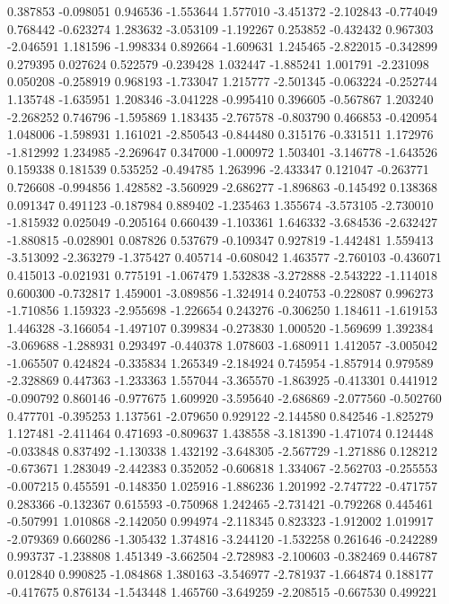 0.387853
-0.098051
0.946536
-1.553644
1.577010
-3.451372
-2.102843
-0.774049
0.768442
-0.623274
1.283632
-3.053109
-1.192267
0.253852
-0.432432
0.967303
-2.046591
1.181596
-1.998334
0.892664
-1.609631
1.245465
-2.822015
-0.342899
0.279395
0.027624
0.522579
-0.239428
1.032447
-1.885241
1.001791
-2.231098
0.050208
-0.258919
0.968193
-1.733047
1.215777
-2.501345
-0.063224
-0.252744
1.135748
-1.635951
1.208346
-3.041228
-0.995410
0.396605
-0.567867
1.203240
-2.268252
0.746796
-1.595869
1.183435
-2.767578
-0.803790
0.466853
-0.420954
1.048006
-1.598931
1.161021
-2.850543
-0.844480
0.315176
-0.331511
1.172976
-1.812992
1.234985
-2.269647
0.347000
-1.000972
1.503401
-3.146778
-1.643526
0.159338
0.181539
0.535252
-0.494785
1.263996
-2.433347
0.121047
-0.263771
0.726608
-0.994856
1.428582
-3.560929
-2.686277
-1.896863
-0.145492
0.138368
0.091347
0.491123
-0.187984
0.889402
-1.235463
1.355674
-3.573105
-2.730010
-1.815932
0.025049
-0.205164
0.660439
-1.103361
1.646332
-3.684536
-2.632427
-1.880815
-0.028901
0.087826
0.537679
-0.109347
0.927819
-1.442481
1.559413
-3.513092
-2.363279
-1.375427
0.405714
-0.608042
1.463577
-2.760103
-0.436071
0.415013
-0.021931
0.775191
-1.067479
1.532838
-3.272888
-2.543222
-1.114018
0.600300
-0.732817
1.459001
-3.089856
-1.324914
0.240753
-0.228087
0.996273
-1.710856
1.159323
-2.955698
-1.226654
0.243276
-0.306250
1.184611
-1.619153
1.446328
-3.166054
-1.497107
0.399834
-0.273830
1.000520
-1.569699
1.392384
-3.069688
-1.288931
0.293497
-0.440378
1.078603
-1.680911
1.412057
-3.005042
-1.065507
0.424824
-0.335834
1.265349
-2.184924
0.745954
-1.857914
0.979589
-2.328869
0.447363
-1.233363
1.557044
-3.365570
-1.863925
-0.413301
0.441912
-0.090792
0.860146
-0.977675
1.609920
-3.595640
-2.686869
-2.077560
-0.502760
0.477701
-0.395253
1.137561
-2.079650
0.929122
-2.144580
0.842546
-1.825279
1.127481
-2.411464
0.471693
-0.809637
1.438558
-3.181390
-1.471074
0.124448
-0.033848
0.837492
-1.130338
1.432192
-3.648305
-2.567729
-1.271886
0.128212
-0.673671
1.283049
-2.442383
0.352052
-0.606818
1.334067
-2.562703
-0.255553
-0.007215
0.455591
-0.148350
1.025916
-1.886236
1.201992
-2.747722
-0.471757
0.283366
-0.132367
0.615593
-0.750968
1.242465
-2.731421
-0.792268
0.445461
-0.507991
1.010868
-2.142050
0.994974
-2.118345
0.823323
-1.912002
1.019917
-2.079369
0.660286
-1.305432
1.374816
-3.244120
-1.532258
0.261646
-0.242289
0.993737
-1.238808
1.451349
-3.662504
-2.728983
-2.100603
-0.382469
0.446787
0.012840
0.990825
-1.084868
1.380163
-3.546977
-2.781937
-1.664874
0.188177
-0.417675
0.876134
-1.543448
1.465760
-3.649259
-2.208515
-0.667530
0.499221
